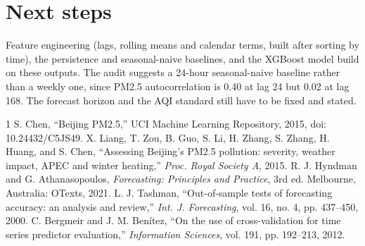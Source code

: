 \documentclass[conference]{IEEEtran}
\begin{document}
\section{Next steps}
Feature engineering (lags, rolling means and calendar terms, built after sorting by time), the persistence and seasonal-naive baselines, and the XGBoost model build on these outputs. The audit suggests a 24-hour seasonal-naive baseline rather than a weekly one, since PM2.5 autocorrelation is 0.40 at lag 24 but 0.02 at lag 168. The forecast horizon and the AQI standard still have to be fixed and stated.

\begin{thebibliography}{1}
 S. Chen, ``Beijing PM2.5,'' UCI Machine Learning Repository, 2015, doi: 10.24432/C5JS49.
 X. Liang, T. Zou, B. Guo, S. Li, H. Zhang, S. Zhang, H. Huang, and S. Chen, ``Assessing Beijing's PM2.5 pollution: severity, weather impact, APEC and winter heating,'' \emph{Proc. Royal Society A}, 2015.
 R. J. Hyndman and G. Athanasopoulos, \emph{Forecasting: Principles and Practice}, 3rd ed. Melbourne, Australia: OTexts, 2021.
 L. J. Tashman, ``Out-of-sample tests of forecasting accuracy: an analysis and review,'' \emph{Int. J. Forecasting}, vol. 16, no. 4, pp. 437--450, 2000.
 C. Bergmeir and J. M. Ben\'{i}tez, ``On the use of cross-validation for time series predictor evaluation,'' \emph{Information Sciences}, vol. 191, pp. 192--213, 2012.
\end{thebibliography}
\end{document}
